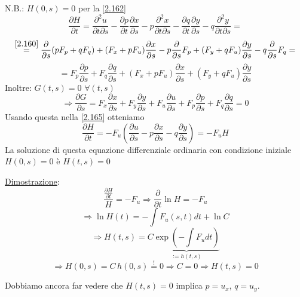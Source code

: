 \documentclass[a4paper,11pt]{report}
\begin{document}
N.B.: $H(0,s)=0$ per la \eqref{2.162}
\[
\frac{\partial H}{\partial t} = \frac{\partial^2 u}{\partial t \partial s} - \frac{\partial p}{\partial t}\frac{\partial x}{\partial s} - p\frac{\partial^2 x}{\partial t \partial s} - \frac{\partial q}{\partial t}\frac{\partial y}{\partial s} - q\frac{\partial^2 y}{\partial t \partial s}=
\]
\[
\overset{\eqref{2.160}}{=} \frac{\partial}{\partial s}(pF_p + qF_q) + (F_x +pF_u)\frac{\partial x}{\partial s} - p\frac{\partial}{\partial s}F_p + (F_y + qF_u)\frac{\partial y}{\partial s} - q \frac{\partial}{\partial s} F_q =
\]
\begin{equation}
=F_p \frac{\partial p}{\partial s} + F_q \frac{\partial q}{\partial s} + (F_x + pF_u)\frac{\partial x}{\partial s} + (F_y + qF_u)\frac{\partial y}{\partial s}
\label{2.165}
\end{equation}
Inoltre: $G(t,s)=0$ $\forall (t,s)$
\[
\Rightarrow \frac{\partial G}{\partial s }=F_x \frac{\partial x}{\partial s} + F_y \frac{\partial y}{\partial s} + F_u \frac{\partial u}{\partial s} + F_p\frac{\partial p}{\partial s} + F_q \frac{\partial q}{ \partial s}=0
\]
Usando questa nella \eqref{2.165} otteniamo
\[
\frac{\partial H}{\partial t} = - F_u\left(\frac{\partial u}{\partial s} - p\frac{\partial x}{\partial s} - q\frac{\partial y}{\partial s}\right)=-F_u H
\]
La soluzione di questa equazione differenziale ordinaria con condizione iniziale $H(0,s)=0$ \`e $H(t,s)=0$

\medskip

\underline{Dimostrazione}:
\[
\frac{\frac{\partial H}{\partial t}}{H}=-F_u \Rightarrow \frac{\partial}{\partial t}\ln H = -F_u
\]
\[
\Rightarrow \ln H(t) = -\int F_u(s,t)dt + \ln C
\]
\[
\Rightarrow H(t,s)=C \underbrace{\exp \left(-\int F_u dt\right)}_{:=h(t,s)}
\]
\[
\Rightarrow H(0,s)= C \, h(0,s) \overset{!}{=}0 \Rightarrow C=0 \Rightarrow H(t,s)=0
\]

\medskip

Dobbiamo ancora far vedere che $H(t,s)=0$ implica $p=u_x$, $q=u_y$. 
\end{document}
